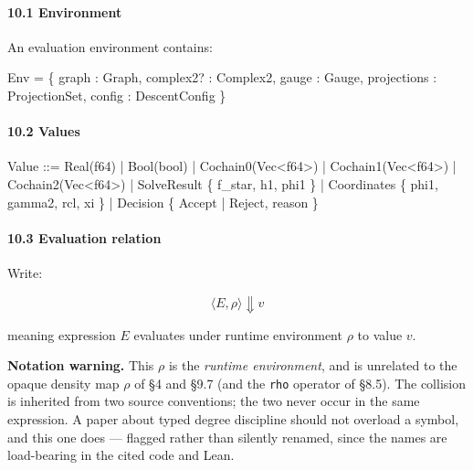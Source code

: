 \documentclass[
]{article}
\newenvironment{Shaded}{\begin{snugshade}}{\end{snugshade}}
\newcommand{\NormalTok}[1]{\textcolor[rgb]{0.12,0.11,0.11}{#1}}
\renewenvironment{quote}
  {\begin{leftbar}\small}
  {\end{leftbar}}
\begin{document}
\paragraph{10.1 Environment}\label{environment}

An evaluation environment contains:

\begin{Shaded}
\begin{Highlighting}[]
\NormalTok{Env = \{}
\NormalTok{    graph        : Graph,}
\NormalTok{    complex2?    : Complex2,}
\NormalTok{    gauge        : Gauge,}
\NormalTok{    projections  : ProjectionSet,}
\NormalTok{    config       : DescentConfig}
\NormalTok{\}}
\end{Highlighting}
\end{Shaded}

\paragraph{10.2 Values}\label{values}

\begin{Shaded}
\begin{Highlighting}[]
\NormalTok{Value ::=}
\NormalTok{    Real(f64)}
\NormalTok{  | Bool(bool)}
\NormalTok{  | Cochain0(Vec\textless{}f64\textgreater{})}
\NormalTok{  | Cochain1(Vec\textless{}f64\textgreater{})}
\NormalTok{  | Cochain2(Vec\textless{}f64\textgreater{})}
\NormalTok{  | SolveResult \{ f\_star, h1, phi1 \}}
\NormalTok{  | Coordinates \{ phi1, gamma2, rcl, xi \}}
\NormalTok{  | Decision \{ Accept | Reject, reason \}}
\end{Highlighting}
\end{Shaded}

\paragraph{10.3 Evaluation relation}\label{evaluation-relation}

Write:

\[
\langle E, \rho \rangle \Downarrow v
\]

meaning expression \(E\) evaluates under runtime environment \(\rho\) to value \(v\).

\begin{quote}
\textbf{Notation warning.} This \(\rho\) is the \emph{runtime environment}, and is unrelated to the opaque density map \(\rho\) of §4 and §9.7 (and the \texttt{rho} operator of §8.5). The collision is inherited from two source conventions; the two never occur in the same expression. A paper about typed degree discipline should not overload a symbol, and this one does --- flagged rather than silently renamed, since the names are load-bearing in the cited code and Lean.
\end{quote}
\end{document}
